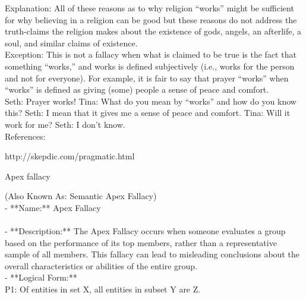 \documentclass[a4paper,12pt,single,pdftex]{scrartcl}
\begin{document}
{    
      Explanation: All of these reasons as to why religion “works” might be sufficient for why believing in a religion can be good  but these reasons do not address the truth-claims the religion makes about the existence of gods, angels, an afterlife, a soul, and similar claims of existence.
    \\

    
      Exception: This is not a fallacy when what is claimed to be true is the fact that something “works,” and works is defined subjectively (i.e., works for the person and not for everyone). For example, it is fair to say that prayer “works” when “works” is defined as giving (some) people a sense of peace and comfort.
    \\

    
      Seth: Prayer works! \newline
Tina: What do you mean by “works” and how do you know this? \newline
Seth: I mean that it gives me a sense of peace and comfort. \newline
Tina: Will it work for me? \newline
Seth: I don’t know.
    \\

    References:

    
      http://skepdic.com/pragmatic.html
    
  }


Apex fallacy
    
      (Also Known As: Semantic Apex Fallacy)
    \\

  
    
      - **Name:** Apex Fallacy
    \\

    
      
    \\

    
      - **Description:** The Apex Fallacy occurs when someone evaluates a group based on the performance of its top members, rather than a representative sample of all members. This fallacy can lead to misleading conclusions about the overall characteristics or abilities of the entire group.
    \\

    
      - **Logical Form:**
    \\

    
      P1: Of entities in set X, all entities in subset Y are Z.
    \\
\end{document}
